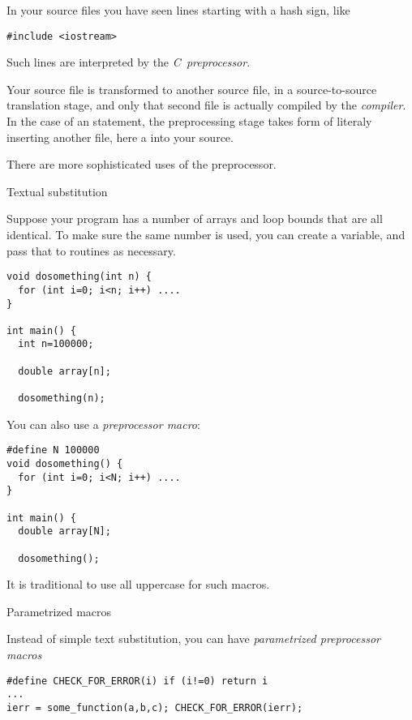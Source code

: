 
In your source files you have seen lines starting with a hash sign,
like
\begin{verbatim}
#include <iostream>
\end{verbatim}
Such lines are interpreted by the
%
\emph{C~preprocessor}.

Your source file is transformed to another source file, in a
source-to-source translation stage, and only that second file is
actually compiled by the
%
\emph{compiler}.
In the case of an  statement, the preprocessing stage
takes form of literaly inserting another file, here a
%
into your source.

There are more sophisticated uses of the preprocessor.

 {Textual substitution}

Suppose your program has a number of arrays and loop bounds that are
all identical. To make sure the same number is used, you can create a
variable, and pass that to routines as necessary.
\begin{verbatim}
void dosomething(int n) {
  for (int i=0; i<n; i++) ....
}

int main() {
  int n=100000;

  double array[n];
   
  dosomething(n);
\end{verbatim}
You can also use a \emph{preprocessor macro}:
\begin{verbatim}
#define N 100000
void dosomething() {
  for (int i=0; i<N; i++) ....
}

int main() {
  double array[N];
   
  dosomething();
\end{verbatim}
It is traditional to use all uppercase for such macros.

 {Parametrized macros}

Instead of simple text substitution, you can have
%
\emph{parametrized preprocessor macros}
\begin{verbatim}
#define CHECK_FOR_ERROR(i) if (i!=0) return i
...
ierr = some_function(a,b,c); CHECK_FOR_ERROR(ierr);
\end{verbatim}

